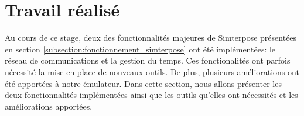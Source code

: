 \section{Travail réalisé}

Au cours de ce stage, deux des fonctionnalités majeures de Simterpose présentées en section \ref{subsection:fonctionnement_simterpose} ont été implémentées: le réseau de communications et la gestion du temps. Ces fonctionalités ont parfois nécessité la mise en place de nouveaux outils. De plus, plusieurs améliorations ont été apportées à notre émulateur. Dans cette section, nous allons présenter les deux fonctionnalités implémentées ainsi que les outils qu'elles ont nécessités et les améliorations apportées.



